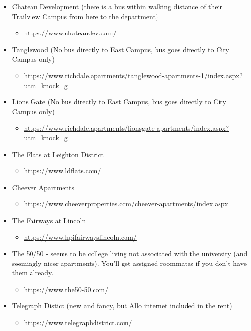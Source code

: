 \documentclass[
  12pt,
]{book}
\providecommand{\tightlist}{%
  \setlength{\itemsep}{0pt}\setlength{\parskip}{0pt}}
\begin{document}
\begin{itemize}
\tightlist
\item
  Chateau Development (there is a bus within walking distance of their Trailview Campus from here to the department)

  \begin{itemize}
  \tightlist
  \item
    \url{https://www.chateaudev.com/}
  \end{itemize}
\item
  Tanglewood (No bus directly to East Campus, bus goes directly to City Campus only)

  \begin{itemize}
  \tightlist
  \item
    \url{https://www.richdale.apartments/tanglewood-apartments-1/index.aspx?utm_knock=g}
  \end{itemize}
\item
  Lions Gate (No bus directly to East Campus, bus goes directly to City Campus only)

  \begin{itemize}
  \tightlist
  \item
    \url{https://www.richdale.apartments/lionsgate-apartments/index.aspx?utm_knock=g}
  \end{itemize}
\item
  The Flats at Leighton District

  \begin{itemize}
  \tightlist
  \item
    \url{https://www.ldflats.com/}
  \end{itemize}
\item
  Cheever Apartments

  \begin{itemize}
  \tightlist
  \item
    \url{https://www.cheeverproperties.com/cheever-apartments/index.aspx}
  \end{itemize}
\item
  The Fairways at Lincoln

  \begin{itemize}
  \tightlist
  \item
    \url{https://www.hpifairwayslincoln.com/}
  \end{itemize}
\item
  The 50/50 - seems to be college living not associated with the university (and seemingly nicer apartments). You'll get assigned roommates if you don't have them already.

  \begin{itemize}
  \tightlist
  \item
    \url{https://www.the50-50.com/}
  \end{itemize}
\item
  Telegraph Distict (new and fancy, but Allo internet included in the rent)

  \begin{itemize}
  \tightlist
  \item
    \url{https://www.telegraphdistrict.com/}
  \end{itemize}
\end{itemize}
\end{document}
